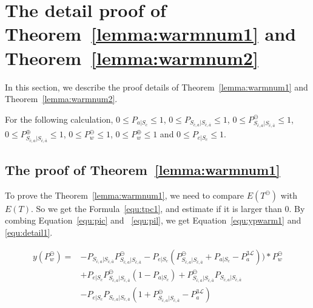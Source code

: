 \newpage
\section{The detail proof of Theorem~\ref{lemma:warmnum1} and Theorem~\ref{lemma:warmnum2}}
\label{appendixa}
In this section, we describe the proof details of Theorem~\ref{lemma:warmnum1} and Theorem~\ref{lemma:warmnum2}.

For the following calculation, $0 \leq P_{a|S_{c}} \leq 1$, $0 \leq P_{S_{\bar{c}, a}|S_{\bar{c},\bar{a}}} \leq 1$, $0 \leq P_{S_{\bar{c}, a}|S_{\bar{c},\bar{a}}}^{\ominus} \leq 1$, $0 \leq P_{S_{\bar{c}, a}|S_{\bar{c},\bar{a}}}^{\oplus} \leq 1$, $0 \leq P_{w}^{\ominus} \leq 1$, $0 \leq P_{w}^{\oplus} \leq 1$
 and $0 \leq P_{e|S_{c}} \leq 1$.

\subsection{The proof of Theorem~\ref{lemma:warmnum1}}
To prove the Theorem~\ref{lemma:warmnum1}, we need to compare $E(T^{\ominus})$ with $E(T)$.
So we get the Formula~\ref{equ:tpc1}, and estimate if it is larger than $0$.
By combing Equation~\ref{equ:pic} and ~\ref{equ:pil}, we get Equation~\ref{equ:ypwarm1} and \ref{equ:detail1}.

\begin{equation}
\label{equ:ypwarm1}
\begin{split}
y(P_{w}^{\ominus}) =& -P_{S_{\bar{c}, a}|S_{\bar{c},\bar{a}}}P_{S_{\bar{c}, a}|S_{\bar{c},\bar{a}}}^{\ominus}-P_{e|S_{c}}(P_{S_{\bar{c}, a}|S_{\bar{c},\bar{a}}}^{\ominus}+P_{a|S_{c}}-P_{a}^{\mathfrak{3}\mathcal{L}}))*P_{w}^{\ominus} \\
& +  P_{e|S_{c}}P_{S_{\bar{c}, a}|S_{\bar{c},\bar{a}}}^{\ominus}(1-P_{a|S_{c}})+P_{S_{\bar{c}, a}|S_{\bar{c},\bar{a}}}^{\ominus}P_{S_{\bar{c}, a}|S_{\bar{c},\bar{a}}}\\
& - P_{e|S_{c}}P_{S_{\bar{c}, a}|S_{\bar{c},\bar{a}}}(1+P_{S_{\bar{c}, a}|S_{\bar{c},\bar{a}}}^{\ominus}-P_{a}^{\mathfrak{3}\mathcal{L}}) \,
\end{split}\end{equation}

